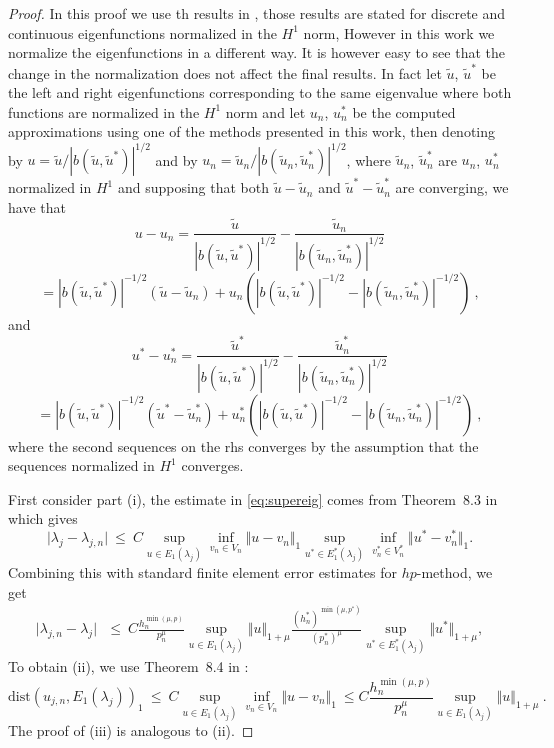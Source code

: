 \documentclass[smallextended]{svjour3}
\begin{document}
\begin{proof}

In this proof we use th results in \cite{babuska}, those results are stated for discrete and continuous eigenfunctions normalized in the $H^1$ norm, However in this work we normalize the eigenfunctions in a different way. It is however easy to see that the change in the normalization does not affect the final results. In fact let $\tilde u$, $\tilde u^*$ be the left and right eigenfunctions corresponding to the same eigenvalue where both functions are normalized in the $H^1$ norm and let $u_n$, $u_n^*$ be the computed approximations using one of the methods presented in this work, then denoting by $ u = \tilde u /|b(\tilde u,\tilde u^*)|^{1/2}$ and by 
$ u_n = \tilde u_n/|b(\tilde u_n,\tilde u_n^*)|^{1/2}$, where $\tilde u_n$, $\tilde u_n^*$ are $u_n$, $u_n^*$ normalized in $H^1$  and supposing that both $\tilde u-\tilde u_n$ and $\tilde u^*-\tilde u_n^*$ are converging, we have that
$$
u - u_n = \frac{\tilde u}{|b(\tilde u,\tilde u^*)|^{1/2}}-\frac{\tilde u_n}{|b(\tilde u_n,\tilde u_n^*)|^{1/2}} 
$$
$$
=
|b(\tilde u,\tilde u^*)|^{-1/2}(\tilde u-\tilde u_n)+ u_n( |b(\tilde u,\tilde u^*)|^{-1/2}- |b(\tilde u_n,\tilde u_n^*)|^{-1/2})\ ,
$$
and
$$
u^* - u_n^* = \frac{\tilde u^*}{|b(\tilde u,\tilde u^*)|^{1/2}}-\frac{\tilde u_n^*}{|b(\tilde u_n,\tilde u_n^*)|^{1/2}} 
$$
$$=
|b(\tilde u,\tilde u^*)|^{-1/2}(\tilde u^*-\tilde u_n^*)+ u_n^*( |b(\tilde u,\tilde u^*)|^{-1/2}- |b(\tilde u_n,\tilde u_n^*)|^{-1/2})\ ,
$$
where the second sequences on the rhs converges by the assumption that the sequences normalized in $H^1$ converges.


First consider part (i), the estimate in \eqref{eq:supereig} comes from  
Theorem~8.3 in \cite{babuska} which gives  
$$ 
\vert \lambda_j - \lambda_{j,n} \vert \ \leq \  C \sup_{u \in
  E_1(\lambda_j)} \inf_{v_n \in V_n} \Vert u - v_n \Vert_1 \sup_{u^* \in
  E_1^*(\lambda_j)} \inf_{v_n^* \in V_n^*} \Vert u^* - v_n^* \Vert_1. 
  $$
Combining this with standard finite element error
estimates for $hp$-method, we get  
\begin{eqnarray}
\vert \lambda_{j,n} - \lambda_j \vert \  \  
\ \leq \ C \frac{h_n^{\min(\mu,p)} }{p_n^{\mu}} \sup_{u \in
  E_1(\lambda_j)} \Vert u \Vert_{1+\mu}\frac{(h_n^*)^{\min(\mu,p^*)} }{(p_n^*)^{\mu}} \sup_{u^* \in
  E_1^*(\lambda_j)} \Vert u^* \Vert_{1+\mu} ,  \label{eq:second_est} 
  \end{eqnarray}
To obtain  (ii), we use Theorem~8.4 in \cite{babuska}:
$$
\mathrm{dist}(
u_{j,n},E_1(\lambda_j))_{1}\ \leq \  C \sup_{u \in
  E_1(\lambda_j)} \inf_{v_n \in V_n} \Vert u - v_n \Vert_1 \ \leq
C \frac{h_n^{\min(\mu,p)} }{p_n^{\mu}} \sup_{u \in
  E_1(\lambda_j)} \Vert u \Vert_{1+\mu}\ .
$$
The proof of (iii) is analogous to (ii).
\end{proof}
\end{document}
